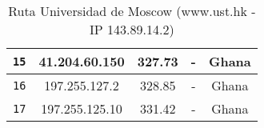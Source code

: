 \begin{table}[ht]
\begin{center}
\begin{tabular}{|c|c|c|c|c|}
    \texttt{15} & 41.204.60.150   & 327.73            & -                          & Ghana                          \\ \hline
    \texttt{16} & 197.255.127.2   & 328.85            & -                          & Ghana                          \\ \hline
    \texttt{17} & 197.255.125.10  & 331.42            & -                          & Ghana                          \\ \hline
    \end{tabular}
    \caption{Ruta Universidad de Moscow (www.ust.hk  - IP 143.89.14.2)}
\end{center}
\end{table}

\begin{figure}[h]
    \centering
\end{figure}